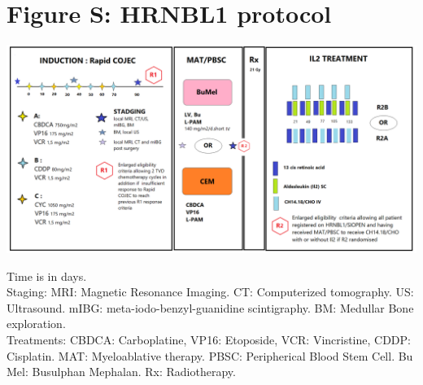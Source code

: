 \documentclass[11pt]{article}
\newcounter{fignb}  %
\begin{document}
\section{Figure S: HRNBL1 protocol}
\spaceV
\begin{center}
\includegraphics[width=1\textwidth]{figure_S1}
\end{center}

Time is in days.\\
Staging: MRI: Magnetic Resonance Imaging. CT: Computerized tomography. US: Ultrasound. mIBG: meta-iodo-benzyl-guanidine scintigraphy. BM: Medullar Bone exploration.\\
Treatments: CBDCA: Carboplatine, VP16: Etoposide, VCR: Vincristine, CDDP: Cisplatin. MAT: Myeloablative therapy. PBSC: Peripherical Blood Stem Cell. Bu Mel: Busulphan Mephalan. Rx: Radiotherapy. 
\newpage
{}
\end{document}
